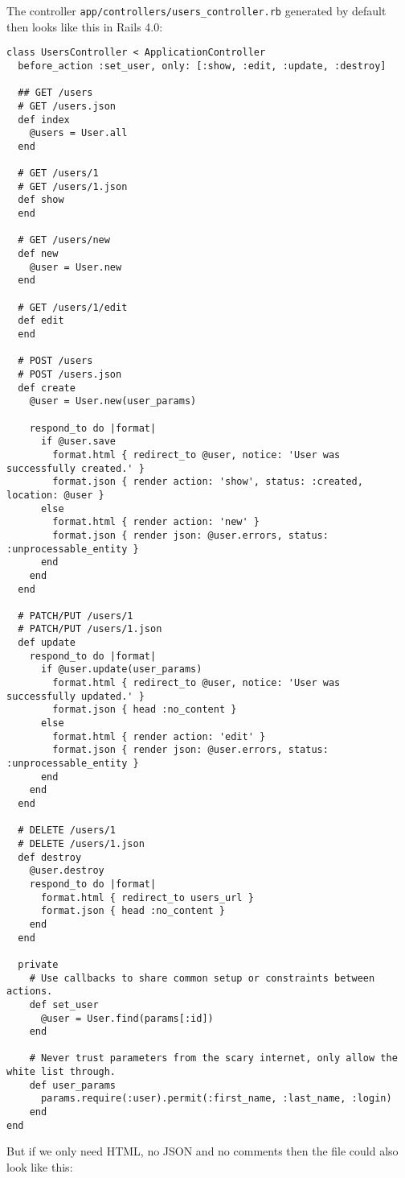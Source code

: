 \documentclass[a4paper]{book}
\begin{document}
The controller \texttt{app/controllers/users\_controller.rb} generated by default then looks like this in Rails 4.0:

\begin{shaded}\begin{verbatim}
class UsersController < ApplicationController
  before_action :set_user, only: [:show, :edit, :update, :destroy]

  ## GET /users
  # GET /users.json
  def index
    @users = User.all
  end

  # GET /users/1
  # GET /users/1.json
  def show
  end

  # GET /users/new
  def new
    @user = User.new
  end

  # GET /users/1/edit
  def edit
  end

  # POST /users
  # POST /users.json
  def create
    @user = User.new(user_params)

    respond_to do |format|
      if @user.save
        format.html { redirect_to @user, notice: 'User was successfully created.' }
        format.json { render action: 'show', status: :created, location: @user }
      else
        format.html { render action: 'new' }
        format.json { render json: @user.errors, status: :unprocessable_entity }
      end
    end
  end

  # PATCH/PUT /users/1
  # PATCH/PUT /users/1.json
  def update
    respond_to do |format|
      if @user.update(user_params)
        format.html { redirect_to @user, notice: 'User was successfully updated.' }
        format.json { head :no_content }
      else
        format.html { render action: 'edit' }
        format.json { render json: @user.errors, status: :unprocessable_entity }
      end
    end
  end

  # DELETE /users/1
  # DELETE /users/1.json
  def destroy
    @user.destroy
    respond_to do |format|
      format.html { redirect_to users_url }
      format.json { head :no_content }
    end
  end

  private
    # Use callbacks to share common setup or constraints between actions.
    def set_user
      @user = User.find(params[:id])
    end

    # Never trust parameters from the scary internet, only allow the white list through.
    def user_params
      params.require(:user).permit(:first_name, :last_name, :login)
    end
end
\end{verbatim}\end{shaded}

But if we only need HTML, no JSON and no comments then the file could also look like this:
\end{document}
